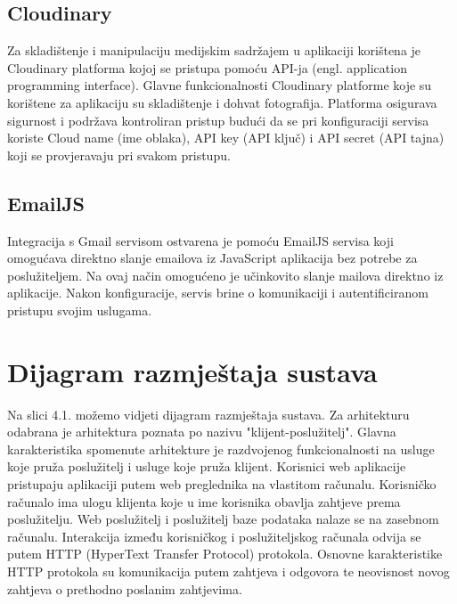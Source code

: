\subsection{Cloudinary}
Za skladištenje i manipulaciju medijskim sadržajem u aplikaciji korištena je Cloudinary platforma kojoj se pristupa pomoću API-ja (engl. application programming interface). Glavne funkcionalnosti Cloudinary platforme koje su korištene za aplikaciju su skladištenje i dohvat fotografija. Platforma osigurava sigurnost i podržava kontroliran pristup budući da se pri konfiguraciji servisa koriste Cloud name (ime oblaka), API key (API ključ) i API secret (API tajna) koji se provjeravaju pri svakom pristupu.

\subsection{EmailJS}
Integracija s Gmail servisom ostvarena je pomoću EmailJS servisa koji omogućava direktno slanje emailova iz JavaScript aplikacija bez potrebe za poslužiteljem. Na ovaj način omogućeno je učinkovito slanje mailova direktno iz aplikacije. Nakon konfiguracije, servis brine o komunikaciji i autentificiranom pristupu svojim uslugama.

\section{Dijagram razmještaja sustava}
Na slici 4.1. možemo vidjeti dijagram razmještaja sustava. Za arhitekturu odabrana je arhitektura poznata po nazivu "klijent-poslužitelj". Glavna karakteristika spomenute arhitekture je razdvojenog funkcionalnosti na usluge koje pruža poslužitelj i usluge koje pruža klijent. Korisnici web aplikacije pristupaju aplikaciji putem web preglednika na vlastitom računalu. Korisničko računalo ima ulogu klijenta koje u ime korisnika obavlja zahtjeve prema poslužitelju. Web poslužitelj i poslužitelj baze podataka nalaze se na zasebnom računalu. Interakcija između korisničkog i poslužiteljskog računala odvija se putem HTTP (HyperText Transfer Protocol) protokola. Osnovne karakteristike HTTP protokola su komunikacija putem zahtjeva i odgovora te neovisnost novog zahtjeva o prethodno poslanim zahtjevima. 

